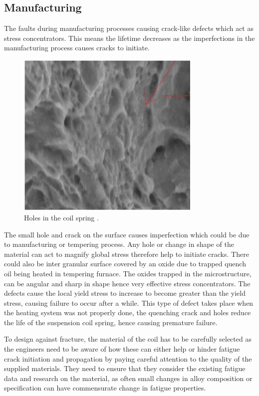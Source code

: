 \documentclass[11pt]{article}
\begin{document}
\subsection{Manufacturing}
The faults during manufacturing processes causing crack-like defects which act as stress concentrators. This means the lifetime decreases as the imperfections in the manufacturing process causes cracks to initiate. 
\begin{figure}[H]
    \centering
    \includegraphics[height = 8cm]{./img/cracks1.png}
    \caption{Holes in the coil spring \cite{b14}.}
    \label{fig:cracks1}
\end{figure}
The small hole and crack on the surface causes imperfection which could be due to manufacturing or tempering process. Any hole or change in shape of the material can act to magnify global stress therefore help to initiate cracks. There could also be inter granular surface covered by an oxide due to trapped quench oil being heated in tempering furnace. The oxides trapped in the microstructure, can be angular and sharp in shape hence very effective stress concentrators. The defects cause the local yield stress to increase to become greater than the yield stress, causing failure to occur after a while. This type of defect takes place when the heating system was not properly done, the quenching crack and holes reduce the life of the suspension coil spring, hence causing premature failure.  
 

To design against fracture, the material of the coil has to be carefully selected as the engineers need to be aware of how these can either help or hinder fatigue crack initiation and propagation by paying careful attention to the quality of the supplied materials. They need to ensure that they consider the existing fatigue data and research on the material, as often small changes in alloy composition or specification can have commensurate change in fatigue properties.  
\end{document}
